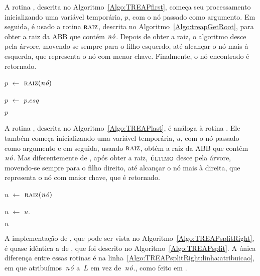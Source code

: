 A rotina \treapFirst{}, descrita no Algoritmo~\ref{Algo:TREAPfirst}, começa seu processamento inicializando uma variável temporária, $p$, com o nó passado como argumento.
Em seguida, é usado a rotina $\treapGetRoot$, descrita no Algoritmo~\ref{Algo:treapGetRoot}, para obter a raiz da ABB que contém $\node$.
Depois de obter a raiz, o algoritmo desce pela árvore, movendo-se sempre para o filho esquerdo, até alcançar o nó mais à esquerda, que representa o nó com menor chave.
Finalmente, o nó encontrado é retornado.

\begin{algorithm}
\caption{\treapFirst($\node$)}
\label{Algo:TREAPfirst}
\begin{algorithmic}[1]
\State $p$ $\gets$ $\treapGetRoot(\node)$

  \State $p$ $\gets$ $p$.$esq$
\EndWhile

\State\Return $p$
\end{algorithmic}
\end{algorithm}

A rotina \treapLast{}, descrita no Algoritmo~\ref{Algo:TREAPlast}, é análoga à rotina \treapFirst{}.
Ele também começa inicializando uma variável temporária, $u$, com o nó passado como argumento e em seguida, usando $\treapGetRoot$, obtém a raiz da ABB que contém $\node$.
Mas diferentemente de \treapFirst{}, após obter a raiz, $\treapLast$ desce pela árvore, movendo-se sempre para o filho direito, até alcançar o nó mais à direita, que representa o nó com maior chave, que é retornado.

\begin{algorithm}
\caption{\treapLast($\node$)}
\label{Algo:TREAPlast}
\begin{algorithmic}[1]
\State $u$ $\gets$ $\treapGetRoot(\node)$

  \State $u$ $\gets$ $u$.
\EndWhile

\State\Return $u$
\end{algorithmic}
\end{algorithm}

A implementação de \treapSplitRight{}, que pode ser vista no Algoritmo~\ref{Algo:TREAPsplitRight}, é quase idêntica a de \treapSplit{}, que foi descrito no Algoritmo~\ref{Algo:TREAPsplit}.
A única diferença entre essas rotinas é na linha~\ref{Algo:TREAPsplitRight:linha:atribuicao}, em que atribuímos~$\node$ a~$L$ em vez de~$\node$., como feito em \treapSplit{}.


